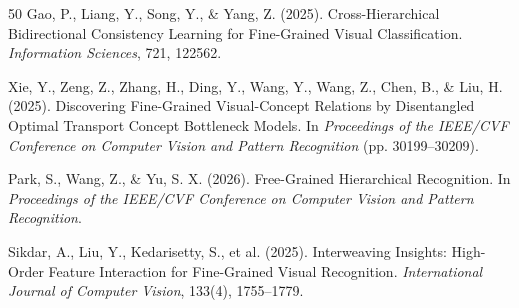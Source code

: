 \documentclass[pdflatex,iicol,sn-mathphys-num]{sn-jnl}
\theoremstyle{thmstyleone}%
\theoremstyle{thmstyletwo}%
\theoremstyle{thmstylethree}%
\begin{document}
{\begin{thebibliography}{50}
     Gao, P., Liang, Y., Song, Y., \& Yang, Z. (2025). Cross-Hierarchical Bidirectional Consistency Learning for Fine-Grained Visual Classification. \textit{Information Sciences}, 721, 122562.
    
    Xie, Y., Zeng, Z., Zhang, H., Ding, Y., Wang, Y., Wang, Z., Chen, B., \& Liu, H. (2025).
    Discovering Fine-Grained Visual-Concept Relations by Disentangled Optimal Transport Concept Bottleneck Models.
    In \textit{Proceedings of the IEEE/CVF Conference on Computer Vision and Pattern Recognition} (pp. 30199--30209).
    
    Park, S., Wang, Z., \& Yu, S. X. (2026).
    Free-Grained Hierarchical Recognition.
    In \textit{Proceedings of the IEEE/CVF Conference on Computer Vision and Pattern Recognition}.

     Sikdar, A., Liu, Y., Kedarisetty, S., et al. (2025). Interweaving Insights: High-Order Feature Interaction for Fine-Grained Visual Recognition. \textit{International Journal of Computer Vision}, 133(4), 1755--1779.
    
\end{thebibliography}
}
\end{document}

